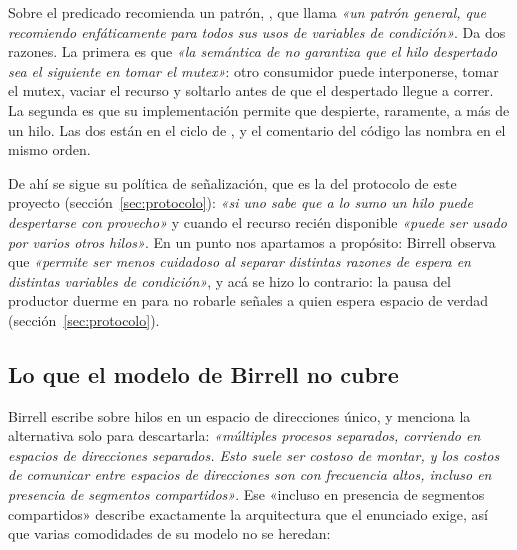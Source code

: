 Sobre el predicado recomienda un patrón, , que llama \emph{«un patrón general, que recomiendo
enfáticamente para todos sus usos de variables de condición»}. Da dos
razones. La primera es que \emph{«la semántica de  no garantiza
que el hilo despertado sea el siguiente en tomar el mutex»}: otro consumidor
puede interponerse, tomar el mutex, vaciar el recurso y soltarlo antes de
que el despertado llegue a correr. La segunda es que su implementación
permite que  despierte, raramente, a más de un hilo. Las dos
están en el ciclo de , y el comentario del código las nombra
en el mismo orden.

De ahí se sigue su política de señalización, que es la del protocolo de
este proyecto (sección~\ref{sec:protocolo}):  \emph{«si uno
sabe que a lo sumo un hilo puede despertarse con provecho»} y
 cuando el recurso recién disponible \emph{«puede ser usado
por varios otros hilos»}. En un punto nos apartamos a propósito: Birrell
observa que  \emph{«permite ser menos cuidadoso al separar
distintas razones de espera en distintas variables de condición»}, y acá se
hizo lo contrario: la pausa del productor duerme en  para no
robarle señales a quien espera espacio de verdad
(sección~\ref{sec:protocolo}).

\subsection{Lo que el modelo de Birrell no cubre}

Birrell escribe sobre hilos en un espacio de direcciones único, y menciona
la alternativa solo para descartarla: \emph{«múltiples procesos separados,
corriendo en espacios de direcciones separados. Esto suele ser costoso de
montar, y los costos de comunicar entre espacios de direcciones son con
frecuencia altos, incluso en presencia de segmentos compartidos»}. Ese
«incluso en presencia de segmentos compartidos» describe exactamente la
arquitectura que el enunciado exige, así
que varias comodidades de su modelo no se heredan:

